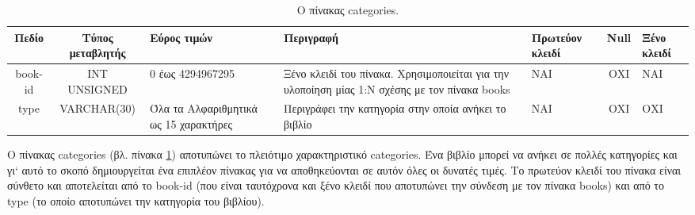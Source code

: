 \documentclass{assignment}
\begin{document}
\begin{landscape}
\begin{table}[htbp]
\begin{center}
  \begin{tabular}{|c|c|m{}|m{}|m{2.0cm}|c|m{1.5cm}|}
    \hline
    {\bf Πεδίο} & {\bf Τύπος μεταβλητής} & {\bf Εύρος τιμών} & {\bf Περιγραφή} & {\bf Πρωτεύον κλειδί} & {\bf Null} & {\bf Ξένο κλειδί} \\ \hline
    book-id & INT UNSIGNED & 0 έως 4294967295 & Ξένο κλειδί του πίνακα. Χρησιμοποιείται για την υλοποίηση μίας 1:N σχέσης με τον πίνακα books & ΝΑΙ & ΟΧΙ & NAI \\ \hline
    type & VARCHAR(30) & Όλα τα Αλφαριθμητικά ως 15 χαρακτήρες & Περιγράφει την κατηγορία στην οποία ανήκει το βιβλίο & ΝΑΙ & ΟΧΙ & ΟΧΙ \\ \hline
  \end{tabular}
\caption{Ο πίνακας categories.}
\label{table:db_table:categories}
\end{center}
\end{table}

Ο πίνακας categories (βλ. πίνακα \ref{table:db_table:categories}) αποτυπώνει το πλειότιμο χαρακτηριστικό categories. Ένα βιβλίο μπορεί να ανήκει σε πολλές κατηγορίες και γι` αυτό το σκοπό δημιουργείται ένα επιπλέον πίνακας για να αποθηκεύονται σε αυτόν όλες οι δυνατές τιμές. Το πρωτεύον κλειδί του πίνακα είναι σύνθετο και αποτελείται από το book-id (που είναι ταυτόχρονα και ξένο κλειδί που αποτυπώνει την σύνδεση με τον πίνακα books) και από το type (το οποίο αποτυπώνει την κατηγορία του βιβλίου). 
\end{landscape}
\end{document}
